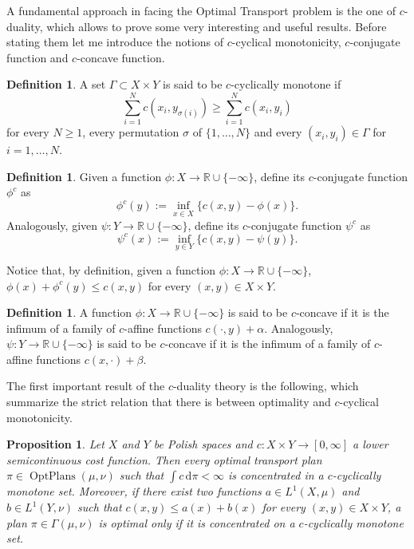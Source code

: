 \documentclass[11pt,twoside,a4paper]{article}
\newcommand{\R}{\mathbb{R}}
\newcommand{\de}{\ensuremath{\, \mathrm d}} %
\DeclareMathOperator{\OptPlans}{OptPlans}
\theoremstyle{theorem}
\newtheorem{prop}[theorem]{Proposition}
\theoremstyle{definition}
\newtheorem{definition}[theorem]{Definition}
\theoremstyle{remark}
\theoremstyle{proof}
\begin{document}
\noindent A fundamental approach in facing the Optimal Transport problem is the one of $c$-duality, which allows to prove some very interesting and useful results. Before stating them let me introduce the notions of $c$-cyclical monotonicity, $c$-conjugate function and $c$-concave function. 



\begin{definition}
A set $\Gamma\subset X\times Y$ is said to be $c$-cyclically monotone if 
\begin{equation*}
    \sum_{i=1}^{N} c\left(x_{i}, y_{\sigma(i)}\right) \geq \sum_{i=1}^{N} c\left(x_{i}, y_{i}\right)
\end{equation*}
for every $N\geq1$, every permutation $\sigma$ of $\{1,\dots,N\}$ and every $(x_i,y_i)\in \Gamma$ for $i=1,\dots,N$.
\end{definition}

\begin{definition}
Given a function $\phi:X \to \R \cup\{-\infty\}$, define its $c$-conjugate function $\phi^c$ as 
\begin{equation*}
    \phi^{c}(y):=\inf _{x \in X}\{c(x, y)-\phi(x)\}.
\end{equation*}
Analogously, given $\psi:Y \to \R \cup\{-\infty\}$, define its $c$-conjugate function $\psi^c$ as 
\begin{equation*}
    \psi^{c}(x):=\inf _{y \in Y}\{c(x, y)-\psi(y)\}.
\end{equation*}
\end{definition}

\noindent Notice that, by definition, given a function $\phi:X \to \R \cup\{-\infty\}$, $\phi(x)+\phi^c(y)\leq c(x,y)$ for every $(x,y)\in X \times Y$. 

\begin{definition}
A function $\phi:X \to \R \cup\{-\infty\}$ is said to be $c$-concave if it is the infimum of a family of $c$-affine functions $c(\cdot, y) + \alpha$. Analogously, $\psi:Y \to \R \cup\{-\infty\}$ is said to be $c$-concave if it is the infimum of a family of $c$-affine functions $c(x, \cdot) + \beta$.
\end{definition}

\noindent The first important result of the $c$-duality theory is the following, which summarize the strict relation that there is between optimality and $c$-cyclical monotonicity.

\begin{prop}\label{prop:cmonotonicity}
Let $X$ and $Y$ be Polish spaces and $c:X\times Y \to [0,\infty]$ a lower semicontinuous cost function. Then every optimal transport plan $\pi\in \OptPlans(\mu,\nu)$ such that $\int c \de \pi<\infty$ is concentrated in a $c$-cyclically monotone set. 
Moreover, if there exist two functions $a\in L^1(X,\mu)$ and $b\in L^1(Y,\nu)$ such that $c(x,y)\leq a(x)+b(x)$ for every $(x,y)\in X\times Y$, a plan $\pi\in \Gamma(\mu,\nu)$ is optimal only if it is concentrated on a $c$-cyclically monotone set.
\end{prop}
\end{document}
